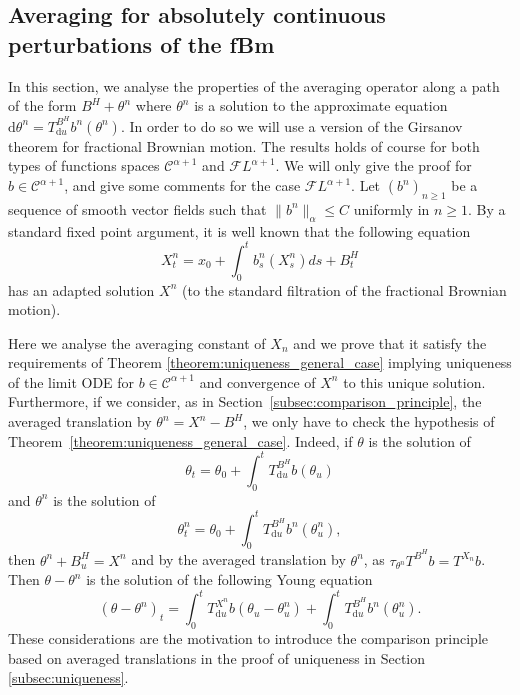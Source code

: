 \documentclass[a4paper,11pt]{article}
\newcommand{\mathd}{\mathrm{d}}
\newcommand{\CC}{\mathscr C}
\newcommand{\CF}{\mathscr F}
\begin{document}
\subsection{Averaging for absolutely continuous perturbations of the fBm}\label{sec:girsanov}

In this section, we analyse the properties of the averaging operator along a
path of the form $B^{H} + \theta^{n}$ where $\theta^{n}$ is a solution to the
approximate equation $\mathd \theta^{n} =T^{B^{H}}_{\mathd u} b^{n} (
\theta^{n} )$. In order to do so we will use a version of the Girsanov theorem
for fractional Brownian motion. The results holds of course for  both
types of functions spaces $\CC^{\alpha +1}$ and $\CF L^{\alpha +1}$. We will
only give the proof for $b \in \CC^{\alpha +1}$, and give some comments for
the case $\CF L^{\alpha +1}$. Let $(b^{n} )_{n \ge 1}$ be a sequence of smooth
vector fields such that $\| b^{n} \|_{\alpha} \leqslant C$ uniformly in $n \ge
1$. By a standard fixed point argument, it is well known that the following
equation
\begin{equation}
  X^{n}_{t} =x_{0} + \int_{0}^{t} b^{n}_{s} (X^{n}_{s} ) ds+B^{H}_{t}
\end{equation}
has an adapted solution $X^{n}$ (to the standard filtration of the fractional
Brownian motion).



Here we analyse the averaging constant of $X_{n}$ and we prove that it
satisfy the requirements of Theorem \ref{theorem:uniqueness_general_case}
implying uniqueness of the limit ODE for $b \in \CC^{\alpha +1}$ and
convergence of $X^{n}$ to this unique solution. Furthermore, if we consider,
as in Section~\ref{subsec:comparison_principle}, the averaged translation by
$\theta^{n} =X^{n} -B^{H}$, we only have to check the hypothesis of
Theorem~\ref{theorem:uniqueness_general_case}. Indeed, if $\theta$ is the solution
of
\[ \theta_{t} = \theta_{0} + \int_{0}^{t} T^{B^{H}}_{\mathd u} b ( \theta_{u}
   ) \]
and $\theta^{n}$ is the solution of
\[ \theta_{t}^{n} = \theta_{0} + \int_{0}^{t} T^{B^{H}}_{\mathd u} b^{n} (
   \theta^{n}_{u} ), \]
then $\theta^{n} +B^{H}_{u} =X^{n}$ and by the averaged translation by
$\theta^{n}$, as $\tau_{\theta^{n}} T^{B^{H}} b=T^{X_{n}} b$. Then $\theta -
\theta^{n}$ is the solution of the following Young equation
\[ ( \theta - \theta^{n} )_{t} = \int_{0}^{t} T^{X^{n}}_{\mathd u} b (
   \theta_{u} - \theta^{n}_{u} ) + \int_{0}^{t} T^{B^{H}}_{\mathd u} b^{n} (
   \theta^{n}_{u} ). \]
These considerations are the motivation to introduce the comparison principle
based on averaged translations in the proof of uniqueness in Section
\ref{subsec:uniqueness}.
\end{document}
